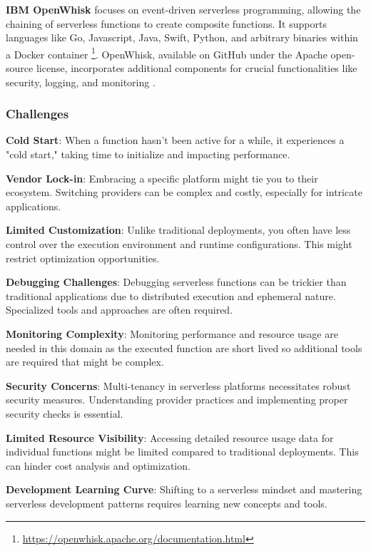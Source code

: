  \textbf{IBM OpenWhisk} focuses on event-driven serverless programming, allowing the chaining of serverless functions to create composite functions. It supports languages like Go, Javascript, Java, Swift, Python, and arbitrary binaries within a Docker container \footnote{\url{https://openwhisk.apache.org/documentation.html}}. OpenWhisk, available on GitHub under the Apache open-source license, incorporates additional components for crucial functionalities like security, logging, and monitoring \cite{Baldini17}.\\

\subsubsection{Challenges}

\textbf{Cold Start}: When a function hasn't been active for a while, it experiences a "cold start," taking time to initialize and impacting performance.

\textbf{Vendor Lock-in}: Embracing a specific platform might tie you to their ecosystem. Switching providers can be complex and costly, especially for intricate applications.

\textbf{Limited Customization}: Unlike traditional deployments, you often have less control over the execution environment and runtime configurations. This might restrict optimization opportunities.

\textbf{Debugging Challenges}: Debugging serverless functions can be trickier than traditional applications due to distributed execution and ephemeral nature. Specialized tools and approaches are often required.

\textbf{Monitoring Complexity}: Monitoring performance and resource usage are needed in this domain as the executed function are short lived so additional tools are required that might be complex.

\textbf{Security Concerns}: Multi-tenancy in serverless platforms necessitates robust security measures. Understanding provider practices and implementing proper security checks is essential.

\textbf{Limited Resource Visibility}: Accessing detailed resource usage data for individual functions might be limited compared to traditional deployments. This can hinder cost analysis and optimization.

\textbf{Development Learning Curve}: Shifting to a serverless mindset and mastering serverless development patterns requires learning new concepts and tools.

